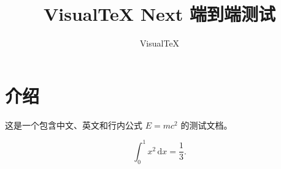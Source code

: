 \documentclass{ctexart}
\title{VisualTeX Next 端到端测试}
\author{VisualTeX}
\begin{document}
\maketitle

\section{介绍}
这是一个包含中文、英文和行内公式 $E=mc^2$ 的测试文档。

\begin{equation}
  \int_0^1 x^2\,\mathrm{d}x = \frac{1}{3}.
\end{equation}
\end{document}
